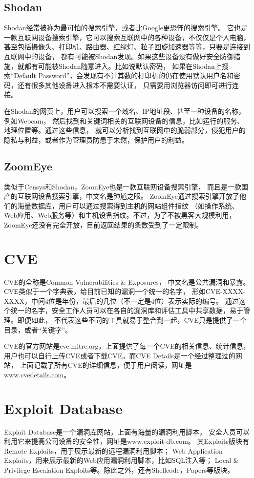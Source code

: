 \subsection{Shodan}
\label{sec:Shodan}

Shodan经常被称为最可怕的搜索引擎，或者比Google更恐怖的搜索引擎。
它也是一款互联网设备搜索引擎，它可以搜索互联网中的各种设备，不仅仅是个人电脑，
甚至包括摄像头、打印机、路由器、红绿灯、粒子回旋加速器等等，只要是连接到互联网中的设备，
都有可能被Shodan发现。如果这些设备没有做好安全防御措施，就都有可能被Shodan随意进入。比如说默认密码，
如果在Shodan上搜索“Default Password”，会发现有不计其数的打印机的仍在使用默认用户名和密码，还有很多其他设备进入根本不需要认证，
只需要用浏览器访问即可进行连接。

在Shodan的网页上，用户可以搜索一个域名、IP地址段、甚至一种设备的名称，例如Webcam，
然后找到和关键词相关的互联网设备的信息，比如运行的服务、地理位置等。通过这些信息，
就可以分析找到互联网中的脆弱部分，侵犯用户的隐私与利益，或者作为管理员防患于未然，保护用户的利益。

\subsection{ZoomEye}
\label{sec:ZoomEye}

类似于Censys和Shodan，ZoomEye也是一款互联网设备搜索引擎，
而且是一款国产的互联网设备搜索引擎，中文名是钟馗之眼。
ZoomEye通过搜索引擎开放了他们的海量数据库，用户可以通过搜索得到主机的网站组件指纹
（如操作系统、Web应用、Web服务等）和主机设备指纹。不过，为了不被黑客大规模利用，
ZoomEye还没有完全开放，目前返回结果的条数受到了一定限制。

\section{CVE}
\label{sec:CVE}

CVE的全称是Common Vulnerabilities \& Exposures，
中文名是公共漏洞和暴露。CVE类似于一个字典表，给目前已知的漏洞一个统一的名字，
形如CVE-XXXX-XXXX，中间4位是年份，最后的几位（不一定是4位）表示实际的编号。
通过这个统一的名字，安全工作人员可以在各自的漏洞库和评估工具中共享数据，易于管理。即便如此，
不代表这些不同的工具就易于整合到一起，CVE只是提供了一个目录，或者“关键字”。

CVE的官方网站是cve.mitre.org，上面提供了每一个CVE的相关信息、统计信息，
用户也可以自行上传CVE或者下载CVE。而CVE Details是一个经过整理过的网站，
上面记载了所有CVE的详细信息，便于用户阅读，网址是www.cvedetails.com。

\section{Exploit Database}
\label{sec:Exploit Database}

Exploit Database是一个漏洞库网站，上面有海量的漏洞利用脚本，
安全人员可以利用它来提高公司设备的安全性，网址是www.exploit-db.com。
其Exploits版块有Remote Exploits，用于展示最新的远程漏洞利用脚本；
Web Application Exploits，用来展示最新的Web应用漏洞利用脚本，比如SQL注入等；
Local \& Privilege Escalation Exploits等。除此之外，还有Shellcode，Papers等版块。
